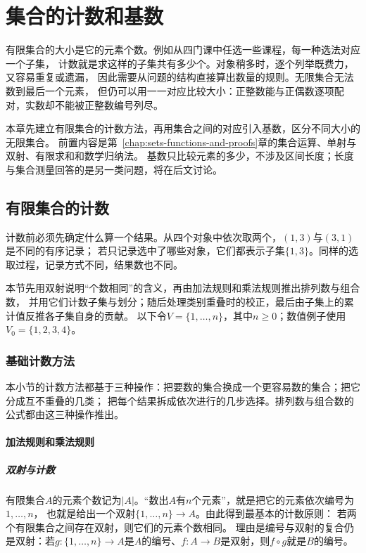 \chapter{集合的计数和基数}
\label{chap:combinatorics}

有限集合的大小是它的元素个数。例如从四门课中任选一些课程，每一种选法对应一个子集，
计数就是求这样的子集共有多少个。对象稍多时，逐个列举既费力，又容易重复或遗漏，
因此需要从问题的结构直接算出数量的规则。无限集合无法数到最后一个元素，
但仍可以用一一对应比较大小：正整数能与正偶数逐项配对，实数却不能被正整数编号列尽。

本章先建立有限集合的计数方法，再用集合之间的对应引入基数，区分不同大小的无限集合。
前置内容是第~\ref{chap:sets-functions-and-proofs}章的集合运算、单射与双射、有限求和和数学归纳法。
基数只比较元素的多少，不涉及区间长度；长度与集合测量回答的是另一类问题，将在后文讨论。

\section{有限集合的计数}
\label{sec:comb-families-counting}

计数前必须先确定什么算一个结果。从四个对象中依次取两个，$(1,3)$与$(3,1)$是不同的有序记录；
若只记录选中了哪些对象，它们都表示子集$\{1,3\}$。同样的选取过程，记录方式不同，结果数也不同。

本节先用双射说明“个数相同”的含义，再由加法规则和乘法规则推出排列数与组合数，
并用它们计数子集与划分；随后处理类别重叠时的校正，最后由子集上的累计值反推各子集自身的贡献。
以下令$V=\{1,\ldots,n\}$，其中$n\geq0$；数值例子使用$V_0=\{1,2,3,4\}$。

\subsection{基础计数方法}
\label{sec:comb-decomposition-counting}
\label{sec:comb-finite-counting}
\label{sec:comb-classification-products}

本小节的计数方法都基于三种操作：把要数的集合换成一个更容易数的集合；把它分成互不重叠的几类；
把每个结果拆成依次进行的几步选择。排列数与组合数的公式都由这三种操作推出。

\subsubsection{加法规则和乘法规则}
\label{sec:comb-classification-counting}

\paragraph{双射与计数}
有限集合$A$的元素个数记为$|A|$。“数出$A$有$n$个元素”，就是把它的元素依次编号为$1,\ldots,n$，
也就是给出一个双射$\{1,\ldots,n\}\to A$。由此得到最基本的计数原则：
若两个有限集合之间存在双射，则它们的元素个数相同。
理由是编号与双射的复合仍是双射：若$g:\{1,\ldots,n\}\to A$是$A$的编号、$f:A\to B$是双射，则$f\circ g$就是$B$的编号。


